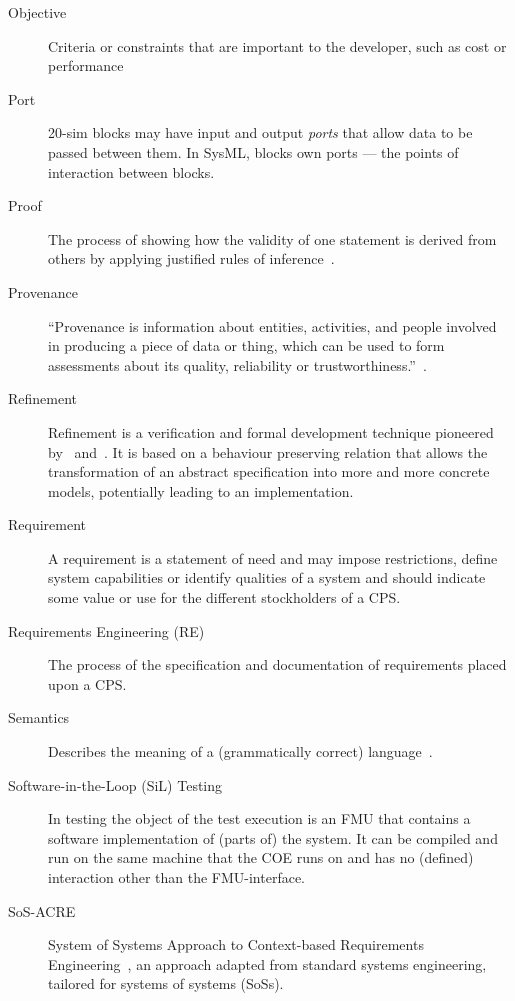 \begin{description}
\item[Objective] Criteria or constraints that are important to the developer, such as cost or performance

\item[Port] 20-sim blocks may have input and output \emph{ports} that allow data to be passed between them. In SysML, blocks own ports --- the points of interaction between blocks.

\item[Proof] The process of showing how the validity of one statement is derived from others by applying justified rules of inference~\cite{Bicarregui&94}.

\item[Provenance] ``Provenance is information about entities, activities, and people involved in producing a piece of data or thing, which can be used to form assessments about its quality, reliability or trustworthiness.''~\cite{Moreau&13}.

\item[Refinement] Refinement is a verification and formal development technique pioneered by~\cite{Back&98} and~\cite{Morgan90a}. It is based on a behaviour preserving relation that allows the transformation of an abstract specification into more and more concrete models, potentially leading to an implementation.

\item[Requirement] A requirement is a statement of need and may impose restrictions, define system capabilities or identify qualities of a system and should indicate some value or use for the different stockholders of a CPS.

\item[Requirements Engineering (RE)] The process of the specification and documentation of requirements placed upon a CPS.

\item[Semantics] Describes the meaning of a (grammatically correct) language~\cite{Nielson&92}.

\item[Software-in-the-Loop (SiL) Testing] In  testing the object of the test execution is an FMU that contains a software implementation of (parts of) the system. It can be compiled and run on the same machine that the COE runs on and has no (defined) interaction other than the FMU-interface.

\item[SoS-ACRE] System of Systems Approach to Context-based Requirements Engineering~\cite{Holt&15}, an approach adapted from standard systems engineering, tailored for systems of systems (SoSs).


\end{description}
